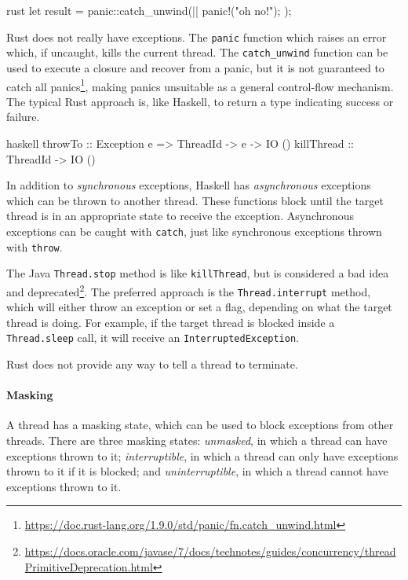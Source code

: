 \begin{listing}
\centering
\begin{cminted}{rust}
let result = panic::catch_unwind(|| {
    panic!("oh no!");
});
\end{cminted}
\caption{Panics in Rust.}\label{lst:excs_rust}
\end{listing}

Rust does not really have exceptions.  The \verb|panic| function which
raises an error which, if uncaught, kills the current thread.  The
\verb|catch_unwind| function can be used to execute a closure and
recover from a panic, but it is not guaranteed to catch all
panics\footnote{\url{https://doc.rust-lang.org/1.9.0/std/panic/fn.catch_unwind.html}},
making panics unsuitable as a general control-flow mechanism.  The
typical Rust approach is, like Haskell, to return a type indicating
success or failure.

\begin{listing}
\centering
\begin{cminted}{haskell}
throwTo    :: Exception e => ThreadId -> e -> IO ()
killThread :: ThreadId -> IO ()
\end{cminted}
\caption{Asynchronous exceptions in Haskell.}\label{lst:excsa_haskell}
\end{listing}

In addition to \emph{synchronous} exceptions, Haskell has
\emph{asynchronous} exceptions which can be thrown to another thread.
These functions block until the target thread is in an appropriate
state to receive the exception.  Asynchronous exceptions can be caught
with \verb|catch|, just like synchronous exceptions thrown with
\verb|throw|.

The Java \verb|Thread.stop| method is like \verb|killThread|, but is
considered a bad idea and
deprecated\footnote{\url{https://docs.oracle.com/javase/7/docs/technotes/guides/concurrency/threadPrimitiveDeprecation.html}}.
The preferred approach is the \verb|Thread.interrupt| method, which
will either throw an exception or set a flag, depending on what the
target thread is doing.  For example, if the target thread is blocked
inside a \verb|Thread.sleep| call, it will receive an
\verb|InterruptedException|.

Rust does not provide any way to tell a thread to terminate.

\paragraph{Masking}
A thread has a masking state, which can be used to block exceptions
from other threads.  There are three masking states: \emph{unmasked},
in which a thread can have exceptions thrown to it;
\emph{interruptible}, in which a thread can only have exceptions
thrown to it if it is blocked; and \emph{uninterruptible}, in which a
thread cannot have exceptions thrown to it.

